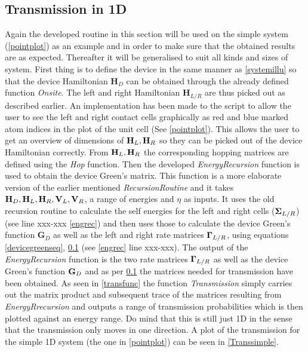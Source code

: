 \subsection{Transmission in 1D}
Again the developed routine in this section will be used on the simple system (\cref{pointplot}) as an example and in order to make sure that the obtained results are as expected. Thereafter it will be generalised to suit all kinds and sizes of system. First thing is to define the device in the same manner as \cref{systemillu} so that the device Hamiltonian \(\textbf{H}_D\) can be obtained through the already defined function \textit{Onsite}. The left and right Hamiltonian \(\textbf{H}_{L/R}\) are thus picked out as described earlier. An implementation has been made to the script to allow the user to see the left and right contact cells graphically as red and blue marked atom indices in the plot of the unit cell (See \cref{pointplot}).
This allows the user to get an overview of dimensions of \(\vb{H}_L,\vb{H}_R\) so they can be picked out of the device Hamiltonian correctly. From \(\vb{H}_L,\vb{H}_R\) the corresponding hopping matrices are defined using the \textit{Hop} function. Then the developed \textit{EnergyRecursion} function is used to obtain the device Green's matrix. This function is a more elaborate version of the earlier mentioned \textit{RecursionRoutine} and it takes \(\vb{H}_D,\vb{H}_L,\vb{H}_R,\vb{V}_L,\vb{V}_R\), a range of energies and \(\eta\) as inputs. It uses the old recursion routine to calculate the self energies for the left and right cells (\(\vb{\Sigma}_{L/R}\)) (see line xxx-xxx \cref{engrec}) and then uses those to calculate the device Green's function \(\textbf{G}_D\) as well as the left and right rate matrices \(\vb{\Gamma}_{L/R}\), using equations \cref{devicegreenseq}, \cref{} (see \cref{engrec} line xxx-xxx).
\vspace{-1\baselineskip}
\vspace{\baselineskip}The output of the \textit{EnergyRecursion} function is the two rate matrices \(\vb{\Gamma}_{L/R}\) as well as the device Green's function \(\vb{G}_D\) and as per \cref{} the matrices needed for transmission have been obtained. As seen in \cref{transfunc} the function \textit{Transmission} simply carries out the matrix product and subsequent trace of the matrices resulting from \textit{EnergyRrecursion} and outputs a range of transmission probabilities which is then plotted against an energy range. Do mind that this is still just 1D in the sense that the transmission only moves in one direction. A plot of the transmission for the simple 1D system (the one in \cref{pointplot}) can be seen in \cref{Transsimple}.
